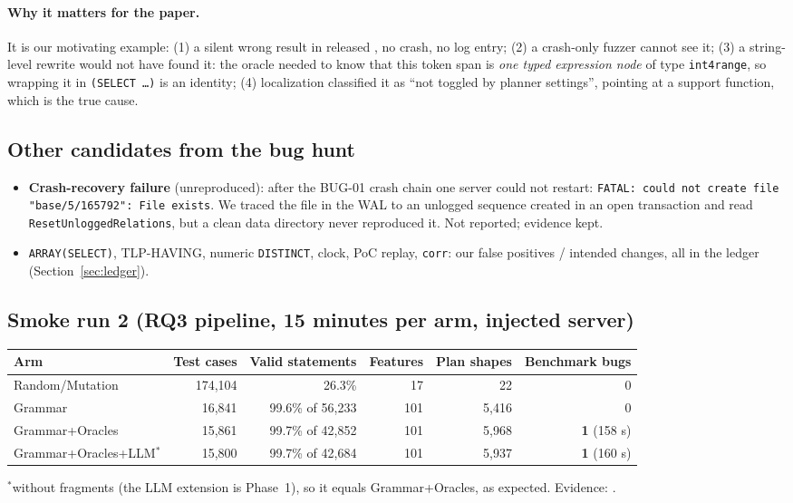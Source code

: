 \paragraph{Why it matters for the paper.} It is our motivating example:
(1) a silent wrong result in released \pg, no crash, no log entry;
(2) a crash-only fuzzer cannot see it; (3) a string-level rewrite would not
have found it: the oracle needed to know that this token span is \emph{one
typed expression node} of type \texttt{int4range}, so wrapping it in
\texttt{(SELECT \dots)} is an identity; (4) localization classified it as
``not toggled by planner settings'', pointing at a support function, which is
the true cause.

\subsection{Other candidates from the bug hunt}
\begin{itemize}
  \item \textbf{Crash-recovery failure} (unreproduced): after the BUG-01 crash
    chain one server could not restart: \texttt{FATAL: could not create file
    "base/5/165792": File exists}. We traced the file in the WAL to an unlogged
    sequence created in an open transaction and read
    \texttt{ResetUnloggedRelations}, but a clean data directory never
    reproduced it. Not reported; evidence kept.
  \item \texttt{ARRAY(SELECT)}, TLP-HAVING, numeric \texttt{DISTINCT}, clock,
    PoC replay, \texttt{corr}: our false positives / intended changes, all in
    the ledger (Section~\ref{sec:ledger}).
\end{itemize}

\subsection{Smoke run 2 (RQ3 pipeline, 15 minutes per arm, injected server)}
\label{sec:smoke}

\begin{center}
\small
\begin{tabular}{lrrrrr}
\toprule
Arm & Test cases & Valid statements & Features & Plan shapes & Benchmark bugs \\
\midrule
Random/Mutation & 174{,}104 & 26.3\% & 17 & 22 & 0 \\
Grammar & 16{,}841 & 99.6\% of 56{,}233 & 101 & 5{,}416 & 0 \\
Grammar+Oracles & 15{,}861 & 99.7\% of 42{,}852 & 101 & 5{,}968 & \textbf{1} (158 s) \\
Grammar+Oracles+LLM$^*$ & 15{,}800 & 99.7\% of 42{,}684 & 101 & 5{,}937 & \textbf{1} (160 s) \\
\bottomrule
\end{tabular}

\footnotesize $^*$without fragments (the LLM extension is Phase~1), so it
equals Grammar+Oracles, as expected. Evidence: .
\end{center}


